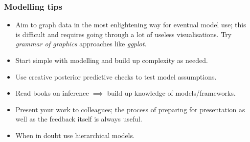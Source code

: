 \documentclass[handout]{beamer}
\begin{document}
\begin{frame}
	\frametitle{Modelling tips}
	\begin{itemize}
		\item<2-> Aim to graph data in the most enlightening way for eventual model use; this is difficult and requires going through a lot of useless visualisations. Try \textit{grammar of graphics} approaches like \textit{ggplot}.
		\item<3-> Start simple with modelling and build up complexity as needed.
		\item<4-> Use creative posterior predictive checks to test model assumptions.
		\item<5-> Read books on inference $\implies$ build up knowledge of models/frameworks.
		\item<6-> Present your work to colleagues; the process of preparing for presentation as well as the feedback itself is always useful.
		\item<7-> When in doubt use hierarchical models.
	\end{itemize}
	
\end{frame}
\end{document}
